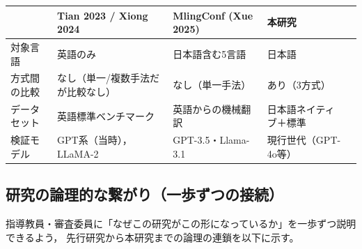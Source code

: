 \documentclass[11pt,a4paper,oneside]{article}
\begin{document}
\begin{center}
\begin{tabular}{lllll}
\toprule
 & Tian 2023 / Xiong 2024 & MlingConf (Xue 2025) & 本研究 \\
\midrule
対象言語 & 英語のみ & 日本語含む5言語 & 日本語 \\
方式間の比較 & なし（単一/複数手法だが比較なし） & なし（単一手法） & あり（3方式） \\
データセット & 英語標準ベンチマーク & 英語からの機械翻訳 & 日本語ネイティブ＋標準 \\
検証モデル & GPT系（当時），LLaMA-2 & GPT-3.5・Llama-3.1 & 現行世代（GPT-4o等） \\
\bottomrule
\end{tabular}
\end{center}

\subsection{研究の論理的な繋がり（一歩ずつの接続）}

指導教員・審査委員に「なぜこの研究がこの形になっているか」を一歩ずつ説明できるよう，
先行研究から本研究までの論理の連鎖を以下に示す。
\end{document}
